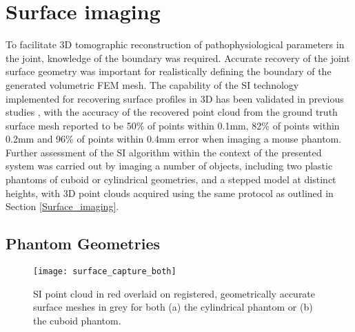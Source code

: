 \documentclass[twoside]{bhamthesis}
\theoremstyle{definition}
\begin{document}
\section{Surface imaging}

To facilitate 3D tomographic reconstruction of pathophysiological parameters in the joint, knowledge of the boundary was required. Accurate recovery of the joint surface geometry was important for realistically defining the boundary of the generated volumetric FEM mesh. The capability of the SI technology implemented for recovering surface profiles in 3D has been validated in previous studies \cite{basevi2013simultaneous,guggenheim2014multi}, with the accuracy of the recovered point cloud from the ground truth surface mesh reported to be 50\% of points within 0.1mm, 82\% of points within 0.2mm and 96\% of points within 0.4mm error when imaging a mouse phantom. Further assessment of the SI algorithm within the context of the presented system was carried out by imaging a number of objects, including two plastic phantoms of cuboid or cylindrical geometries, and a stepped model at distinct heights, with 3D point clouds acquired using the same protocol as outlined in Section \ref{Surface_imaging}.


\subsection{Phantom Geometries}
\label{phantom_SI}

\begin{figure}[!ht]
\texttt{[image: surface\_capture\_both]}
\centering
\caption{SI point cloud in red overlaid on registered, geometrically accurate surface meshes in grey for both (a) the cylindrical phantom or (b) the cuboid phantom.}
\label{surface_capture_both}
\end{figure}
\end{document}
